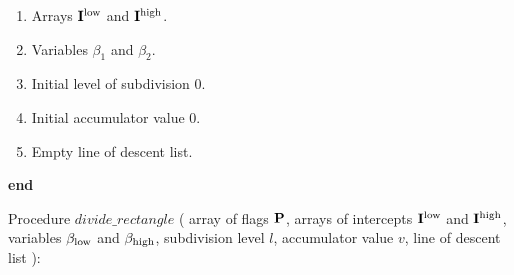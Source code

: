 \begin{indent_para}
\begin{enumerate}
	  \item Arrays ${\bf I}^{\rm low}$ and ${\bf I}^{\rm high}$.

	  \item Variables $\beta_1$ and $\beta_2$.

	  \item Initial level of subdivision 0.

	  \item Initial accumulator value 0.

	  \item Empty line of descent list.
   \end{enumerate}
  \end{indent_para}
  {\bf end}

  Procedure $divide\_rectangle$ ( array of flags ${\bf P}$, arrays of
	    intercepts ${\bf I}^{\rm low}$ and ${\bf I}^{\rm high}$,
	    variables $\beta_{\rm low}$ and $\beta_{\rm high}$,
	    subdivision level $l$, accumulator value $v$,
	    line of descent list ):

